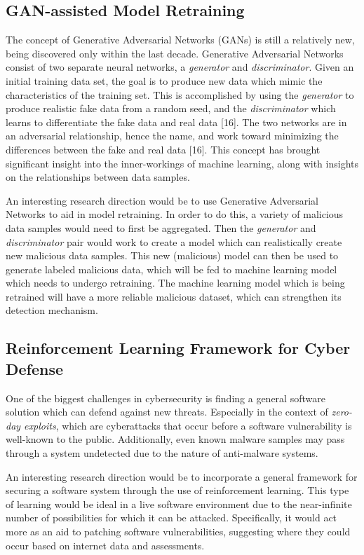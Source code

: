\documentclass[11pt,conference]{IEEEtran}
\begin{document}
\subsection{GAN-assisted Model Retraining}
The concept of Generative Adversarial Networks (GANs) is still a relatively
new, being discovered only within the last decade. Generative Adversarial
Networks consist of two separate neural networks, a \emph{generator}
and \emph{discriminator}. Given an initial training data set, the goal is to
produce new data which mimic the characteristics of the training set. This is
accomplished by using the \emph{generator} to produce realistic fake data from
a random seed, and the \emph{discriminator} which learns to differentiate the
fake data and real data [16]. The two networks are in an adversarial relationship,
hence the name, and work toward minimizing the differences between the fake and
real data [16]. This concept has brought significant insight into the inner-workings
of machine learning, along with insights on the relationships between data
samples.

An interesting research direction would be to use Generative Adversarial
Networks to aid in model retraining. In order to do this, a
variety of malicious data samples would need to first be aggregated. Then the
\emph{generator} and \emph{discriminator} pair would work to create a model
which can realistically create new malicious data samples. This new (malicious)
model can then be used to generate labeled malicious data, which will be fed to
machine learning model which needs to undergo retraining. The machine learning
model which is being retrained will have a more reliable malicious dataset,
which can strengthen its detection mechanism.

\subsection{Reinforcement Learning Framework for Cyber Defense}
One of the biggest challenges in cybersecurity is finding a general software
solution which can defend against new threats. Especially in the
context of \emph{zero-day exploits}, which are cyberattacks that occur before a
software vulnerability is well-known to the public. Additionally, even known
malware samples may pass through a system undetected due to the nature of
anti-malware systems.

An interesting research direction would be to incorporate a general framework
for securing a software system through the use of reinforcement learning. This
type of learning would be ideal in a live software environment due to the
near-infinite number of possibilities for which it can be attacked. Specifically, it
would act more as an aid to patching software vulnerabilities, suggesting where
they could occur based on internet data and assessments.
\end{document}
